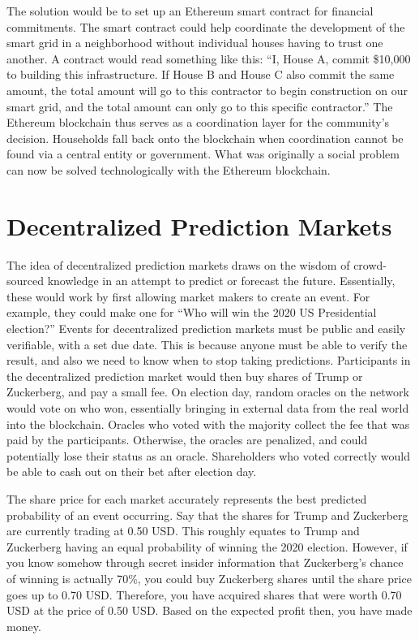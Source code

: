 \documentclass[full.tex]{subfiles}
\begin{document}
    The solution would be to set up an Ethereum smart contract for financial commitments. The smart contract could help coordinate the development of the smart grid in a neighborhood without individual houses having to trust one another. A contract would read something like this: ``I, House A, commit \$10,000 to building this infrastructure. If House B and House C also commit the same amount, the total amount will go to this contractor to begin construction on our smart grid, and the total amount can only go to this specific contractor.'' The Ethereum blockchain thus serves as a coordination layer for the community's decision. Households fall back onto the blockchain when coordination cannot be found via a central entity or government. What was originally a social problem can now be solved technologically with the Ethereum blockchain. 
    
    \section*{Decentralized Prediction Markets}
    
    The idea of decentralized prediction markets draws on the wisdom of crowd-sourced knowledge in an attempt to predict or forecast the future. Essentially, these would work by first allowing market makers to create an event. For example, they could make one for ``Who will win the 2020 US Presidential election?'' Events for decentralized prediction markets must be public and easily verifiable, with a set due date. This is because anyone must be able to verify the result, and also we need to know when to stop taking predictions. Participants in the decentralized prediction market would then buy shares of Trump or Zuckerberg, and pay a small fee. On election day, random oracles on the network would vote on who won, essentially bringing in external data from the real world into the blockchain. Oracles who voted with the majority collect the fee that was paid by the participants. Otherwise, the oracles are penalized, and could potentially lose their status as an oracle. Shareholders who voted correctly would be able to cash out on their bet after election day.
    
    The share price for each market accurately represents the best predicted probability of an event occurring. Say that the shares for Trump and Zuckerberg are currently trading at 0.50 USD. This roughly equates to Trump and Zuckerberg having an equal probability of winning the 2020 election. However, if you know somehow through secret insider information that Zuckerberg's chance of winning is actually 70\%, you could buy Zuckerberg shares until the share price goes up to 0.70 USD. Therefore, you have acquired shares that were worth 0.70 USD at the price of 0.50 USD. Based on the expected profit then, you have made money.
    
\end{document}
